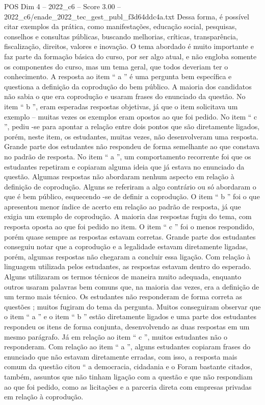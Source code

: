 \begin{textsample}{POS Dim 4 – 2022\_c6 – Score 3.00 – 2022\_c6/enade\_2022\_tec\_gest\_publ\_f3d64ddc4a.txt}
Dessa forma, é possível citar exemplos da prática, como manifestações, educação social, pesquisas, conselhos e consultas públicas, buscando melhorias, críticas, transparência, fiscalização, direitos, valores e inovação.
O tema abordado é muito importante e faz parte da formação básica do curso, por ser algo atual, e não engloba somente os componentes do curso, mas um tema geral, que todos deveriam ter o conhecimento.
A resposta ao item “ a ” é uma pergunta bem específica e questiona a definição da coprodução do bem público.
A maioria dos candidatos não sabia o que era coprodução e usaram frases do enunciado da questão.
No item “ b ”, eram esperadas respostas objetivas, já que o item solicitava um exemplo – muitas vezes os exemplos eram opostos ao que foi pedido.
No item “ c ”, pediu -se para apontar a relação entre dois pontos que são diretamente ligados, porém, neste item, os estudantes, muitas vezes, não desenvolveram uma resposta.
Grande parte dos estudantes não respondeu de forma semelhante ao que constava no padrão de resposta.
No item “ a ”, um comportamento recorrente foi que os estudantes repetiram e copiaram alguma ideia que já estava no enunciado da questão.
Algumas respostas não abordaram nenhum aspecto em relação à definição de coprodução.
Alguns se referiram a algo contrário ou só abordaram o que é bem público, esquecendo -se de definir a coprodução.
O item “ b ” foi o que apresentou menor índice de acerto em relação ao padrão de resposta, já que exigia um exemplo de coprodução.
A maioria das respostas fugiu do tema, com resposta oposta ao que foi pedido no item.
O item “ c ” foi o menos respondido, porém quase sempre as respostas estavam corretas.
Grande parte dos estudantes conseguiu notar que a coprodução e a legalidade estavam diretamente ligadas, porém, algumas respostas não chegaram a concluir essa ligação.
Com relação à linguagem utilizada pelos estudantes, as respostas estavam dentro do esperado.
Alguns utilizaram os termos técnicos de maneira muito adequada, enquanto outros usaram palavras bem comuns que, na maioria das vezes, era a definição de um termo mais técnico.
Os estudantes não responderam de forma correta as questões ; muitos fugiram do tema da pergunta.
Muitos conseguiram observar que o item “ a ” e o item “ b ” estão diretamente ligados e uma parte dos estudantes respondeu os itens de forma conjunta, desenvolvendo as duas respostas em um mesmo parágrafo.
Já em relação ao item “ c ”, muitos estudantes não o responderam.
Com relação ao item “ a ”, alguns estudantes copiaram frases do enunciado que não estavam diretamente erradas, com isso, a resposta mais comum da questão citou “ a democracia, cidadania e o Foram bastante citados, também, assuntos que não tinham ligação com a questão e que não respondiam ao que foi pedido, como as licitações e a parceria direta com empresas privadas em relação à coprodução.

\end{textsample}
